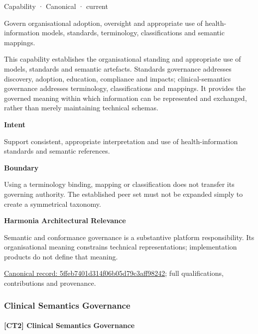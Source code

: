 \label{element:5ffeb7401d314f06b05d79c3aff98242}
{\small Capability · Canonical · current}\par

Govern organisational adoption, oversight and appropriate use of health-information models, standards, terminology, classifications and semantic mappings.



This capability establishes the organisational standing and appropriate use of models, standards and semantic artefacts. Standards governance addresses discovery, adoption, education, compliance and impacts; clinical-semantics governance addresses terminology, classifications and mappings. It provides the governed meaning within which information can be represented and exchanged, rather than merely maintaining technical schemas.



\textbf{Intent}



Support consistent, appropriate interpretation and use of health-information standards and semantic references.



\textbf{Boundary}



Using a terminology binding, mapping or classification does not transfer its governing authority. The established peer set must not be expanded simply to create a symmetrical taxonomy.



\textbf{Harmonia Architectural Relevance}



Semantic and conformance governance is a substantive platform responsibility. Its organisational meaning constrains technical representations; implementation products do not define that meaning.


{\footnotesize \href{../../../../continuum/strategy/capability/5ffeb7401d314f06b05d79c3aff98242.md}{Canonical record: 5ffeb7401d314f06b05d79c3aff98242}; full qualifications, contributions and provenance.}\par
\subsubsection{Clinical Semantics Governance}

\paragraph{[CT2] Clinical Semantics Governance}

